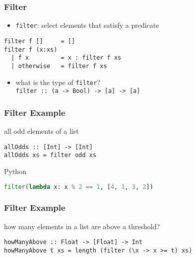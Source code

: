 \documentclass[dvipsnames]{beamer}
\theoremstyle{plain}
\begin{document}
\begin{frame}[fragile]
  \frametitle{Filter}

  \begin{itemize}
    \item \lstinline|filter|: select elements that satisfy a predicate
  \end{itemize}

  \begin{exampleblock}{}
    \begin{lstlisting}[deletekeywords={filter}]
filter f []     = []
filter f (x:xs)
  | f x         = x : filter f xs
  | otherwise   = filter f xs
    \end{lstlisting}
  \end{exampleblock}

  \pause
  \begin{itemize}
    \item what is the type of \lstinline|filter|?\\
      \lstinline|filter :: (a -> Bool) -> [a] -> [a]|
  \end{itemize}
\end{frame}

\begin{frame}[fragile]
  \frametitle{Filter Example}

  \begin{exampleblock}{all odd elements of a list}
    \begin{lstlisting}
allOdds :: [Int] -> [Int]
allOdds xs = filter odd xs
    \end{lstlisting}
  \end{exampleblock}

  \bigskip
  \begin{exampleblock}{Python}
    \begin{lstlisting}[language=Python]
filter(lambda x: x % 2 == 1, [4, 1, 3, 2])
    \end{lstlisting}
  \end{exampleblock}
\end{frame}

\begin{frame}[fragile]
  \frametitle{Filter Example}

  \begin{exampleblock}{how many elements in a list are above a threshold?}
    \begin{lstlisting}
howManyAbove :: Float -> [Float] -> Int
howManyAbove t xs = length (filter (\x -> x >= t) xs)
    \end{lstlisting}
  \end{exampleblock}
\end{frame}
\end{document}
